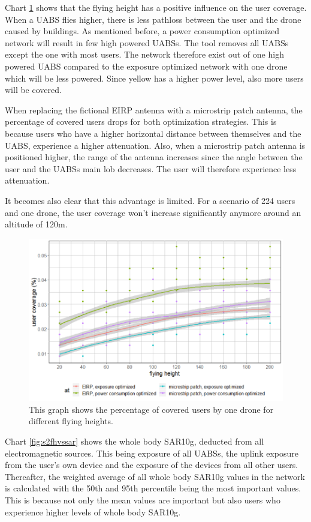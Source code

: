 Chart  \ref{fig:s2fhvscov} shows that the flying height has a positive influence on the user coverage. 
When a \gls{UABS} flies higher, there is less pathloss between the user and the drone caused by buildings. 
As mentioned before, a power consumption optimized network will result in few high powered \gls{UABS}s. 
The tool removes all \gls{UABS}s except the one with most users. 
The network therefore exist out of one high powered \gls{UABS} compared to the exposure optimized network with one drone which 
will be less powered. Since yellow has a higher power level, also more users will be covered.

When replacing the fictional \gls{EIRP} antenna with a microstrip patch antenna, the percentage of covered users drops for both 
optimization strategies. This is because users who have a higher horizontal distance between themselves and the \gls{UABS}, 
experience a higher attenuation. Also, when a microstrip patch antenna is positioned higher, the range of the antenna increases 
since the angle between the user and the \gls{UABS}s main lob decreases. The user will therefore experience less attenuation.

It becomes also clear that this advantage is limited. For a scenario of 224 users and one drone, the user coverage won’t increase
 significantly anymore around an altitude of 120m.

\begin{figure}[h!]
  \includegraphics[width=\textwidth]{../results/s2/fhvscov.png}
  \caption{This graph shows the percentage of covered users by one drone for different flying heights.}
  \label{fig:s2fhvscov}
\end{figure}

Chart \ref{fig:s2fhvssar} shows the whole body SAR10g, deducted from all electromagnetic sources. This being exposure of all \gls{UABS}s,
 the uplink exposure from the user’s own device and the exposure of the devices from all other users. 
 Thereafter, the weighted average of all whole body SAR10g values in the network is calculated with the 50th and 95th percentile 
 being the most important values. This is because not only the mean values are important but also users who experience higher 
 levels of whole body SAR10g.


